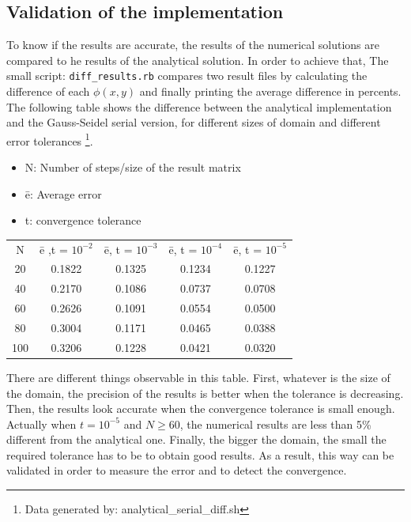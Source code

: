 \documentclass[a4paper,11pt]{article}
\begin{document}
\subsection{Validation of the implementation}

To know if the results are accurate, the results of the numerical solutions are compared to he results of the analytical solution. In order to
achieve that, The small script: \texttt{diff\_results.rb} compares two result files by calculating the
difference of each $\phi(x,y)$ and finally printing the average difference in percents. The following table shows the difference
between the analytical implementation and the Gauss-Seidel serial version, for different sizes of domain and different error tolerances
\footnote{Data generated by: analytical\_serial\_diff.sh}.

\begin{itemize}
\item{N: Number of steps/size of the result matrix}
\item{\=e: Average error}
\item{t: convergence tolerance}
\end{itemize}

\begin{center}
\begin{tabular}{c | c | c | c | c}
N & \=e ,t = $10^{-2}$ & \=e, t = $10^{-3}$ & \=e, t = $10^{-4}$ & \=e, t = $10^{-5}$ \\
20 & 0.1822 & 0.1325 & 0.1234 & 0.1227 \\
40 & 0.2170 & 0.1086 & 0.0737 & 0.0708 \\
60 & 0.2626 & 0.1091 & 0.0554 & 0.0500 \\
80 & 0.3004 & 0.1171 & 0.0465 & 0.0388 \\
100 & 0.3206 & 0.1228 & 0.0421 & 0.0320 \\
\end{tabular}
\vspace{1em}
\end{center}

There are different things observable in this table. First, whatever is the size of the domain,
the precision of the results is better when the tolerance is decreasing. Then, the results look accurate when the 
convergence tolerance is small enough. Actually when $t = 10^{-5}$ and $N \geq 60$, the numerical results are less
than 5\% different from the analytical one. Finally, the bigger the domain, the small the required
tolerance has to be to obtain good results. As a result, this way can be validated in order to measure the error and to detect the
convergence.
\end{document}
